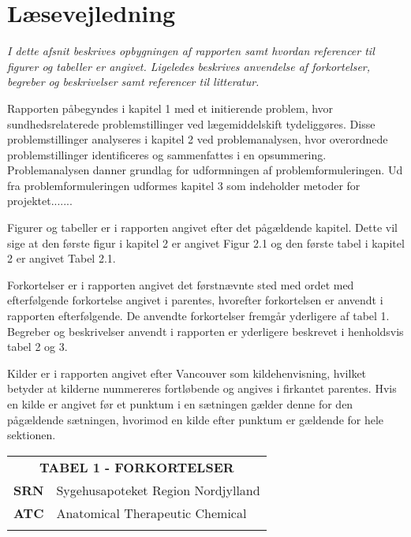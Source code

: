 \section*{Læsevejledning}
\textit{I dette afsnit beskrives opbygningen af rapporten samt hvordan referencer til figurer og tabeller er angivet. Ligeledes beskrives anvendelse af forkortelser, begreber og beskrivelser samt referencer til litteratur.}

Rapporten påbegyndes i kapitel 1 med et initierende problem, hvor sundhedsrelaterede problemstillinger ved lægemiddelskift tydeliggøres. Disse problemstillinger analyseres i kapitel 2 ved problemanalysen, hvor overordnede problemstillinger identificeres og sammenfattes i en opsummering. Problemanalysen danner grundlag for udformningen af problemformuleringen. Ud fra problemformuleringen udformes kapitel 3 som indeholder metoder for projektet.......

Figurer og tabeller er i rapporten angivet efter det pågældende kapitel. Dette vil sige at den første figur i kapitel 2 er angivet Figur 2.1 og den første tabel i kapitel 2 er angivet Tabel 2.1.

Forkortelser er i rapporten angivet det førstnævnte sted med ordet med efterfølgende forkortelse angivet i parentes, hvorefter forkortelsen er anvendt i rapporten efterfølgende. De anvendte forkortelser fremgår yderligere af tabel 1. Begreber og beskrivelser  anvendt i rapporten er yderligere beskrevet i henholdsvis tabel 2 og 3.

Kilder er i rapporten angivet efter Vancouver som kildehenvisning, hvilket betyder at kilderne nummereres fortløbende og angives i firkantet parentes. Hvis en kilde er angivet før et punktum i en sætningen gælder denne for den pågældende sætningen, hvorimod en kilde efter punktum er gældende for hele sektionen.


\begin{table}[H]
\label{table:forkortelser}
\begin{tabular}{p{1.5cm} p{12.8cm}}
\multicolumn{2}{c}{\cellcolor[HTML]{C0C0C0}\textbf{TABEL 1 - FORKORTELSER}} \vspace{0.5cm} \\
\textbf{SRN} & Sygehusapoteket Region Nordjylland \vspace{0.5cm} \\
\textbf{ATC} & Anatomical Therapeutic Chemical \vspace{0.5cm} \\
  & \vspace{0.5cm} \\
\end{tabular}
\end{table}

